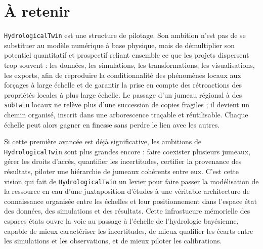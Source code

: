 \documentclass[11pt,a4paper]{article}
\newcommand{\hydrot}{\texttt{HydrologicalTwin}}
\newcommand{\subt}{\texttt{subTwin}}
\newcommand{\eauspra}{\texttt{EAU SPRA}}
\begin{document}
\begin{abstract}
\hydrot{} devient ainsi un levier pour faire passer la modélisation de la ressource en eau d'une juxtaposition d'études à une véritable architecture de connaissances organisées entre les échelles, du bassin au site local, sans perdre ni la logique scientifique, ni la mémoire des calculs.  C'est aussi une brique fondamentale et élémentaire de la future plateforme \eauspra, qui permettra de faire dialoguer les jumeaux régionaux, territoriaux et locaux dans une même logique d'organisation et de gouvernance des simulations numériques.

\end{abstract}

\section*{\`A retenir}

\hydrot{} est une structure de pilotage. Son ambition n'est pas de se substituer au modèle numérique à base physique, mais de démultiplier son potentiel quantitatif et prospectif reliant  ensemble ce que les projets dispersent trop souvent : les données, les simulations, les transformations, les visualisations, les exports, afin de reproduire la conditionnalité des phénomènes locaux aux forçages à large échelle et de garantir la prise en compte des rétroactions des propriétés locales à plus large échelle. Le passage d'un jumeau régional à des \subt{} locaux ne relève plus d'une succession de copies fragiles ; il devient un chemin organisé, inscrit dans une arborescence traçable et réutilisable. Chaque échelle peut alors gagner en finesse sans perdre le lien avec les autres.

Si cette première avancée est déjà significative, les ambitions de \hydrot{} sont plus grandes encore : faire coexister plusieurs jumeaux, gérer les droits d'accès, quantifier les incertitudes, certifier la provenance des résultats, piloter une hiérarchie de jumeaux cohérents entre eux. C'est cette vision qui fait de \hydrot{} un levier pour faire passer la modélisation de la ressource en eau d'une juxtaposition d'études à une véritable architecture de connaissance organisée entre les échelles et leur positionnement dans l'espace état des données, des simulations et des résultats. Cette infrastucure mémorielle des espaces états ouvre la voie au passage à l'échelle de l'hydrologie bayésienne, capable de mieux caractériser les incertitudes, de mieux qualifier les écarts entre les simulations et les observations, et de mieux piloter les calibrations.
\end{document}
